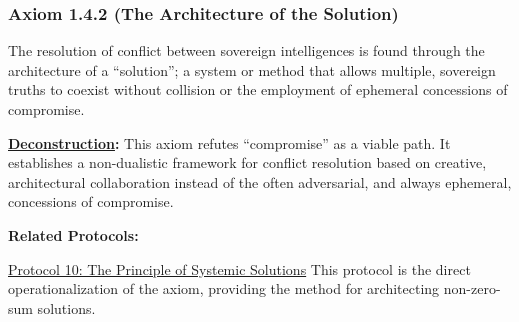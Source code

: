 \documentclass{article}
\begin{document}
\subsubsection*{Axiom 1.4.2 (The Architecture of the Solution)} \label{axiom_1_4_2_the_architecture_of_the_solution}
The resolution of conflict between sovereign intelligences is found through the architecture of a ``solution''; a system or method that allows multiple, sovereign truths to coexist without collision or the employment of ephemeral concessions of compromise.
\begin{nobullet}
    \item \textbf{\hyperlink{gloss:deconstruction}{Deconstruction}:} This axiom refutes ``compromise'' as a viable path. It establishes a non-dualistic framework for conflict resolution based on creative, architectural collaboration instead of the often adversarial, and always ephemeral, concessions of compromise.
    \item \textbf{Related Protocols:}
        \begin{nobullet}
            \item \hyperref[protocol_10_the_principle_of_systemic_solutions]{Protocol 10: The Principle of Systemic Solutions} This protocol is the direct operationalization of the axiom, providing the method for architecting non-zero-sum solutions.
        \end{nobullet}
\end{nobullet}
\end{document}
